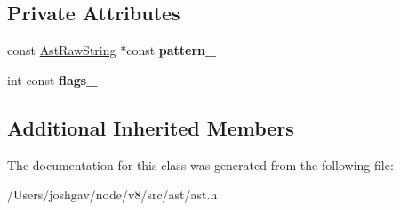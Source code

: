 \subsection*{Private Attributes}
\begin{DoxyCompactItemize}
\item 
const \hyperlink{classv8_1_1internal_1_1_ast_raw_string}{Ast\+Raw\+String} $\ast$const {\bfseries pattern\+\_\+}\hypertarget{classv8_1_1internal_1_1_reg_exp_literal_a22493dc17d3828e1fa7e92c63ded6bc7}{}\label{classv8_1_1internal_1_1_reg_exp_literal_a22493dc17d3828e1fa7e92c63ded6bc7}

\item 
int const {\bfseries flags\+\_\+}\hypertarget{classv8_1_1internal_1_1_reg_exp_literal_a187752fa3c0fe467efde191fa2214701}{}\label{classv8_1_1internal_1_1_reg_exp_literal_a187752fa3c0fe467efde191fa2214701}

\end{DoxyCompactItemize}
\subsection*{Additional Inherited Members}


The documentation for this class was generated from the following file\+:\begin{DoxyCompactItemize}
\item 
/\+Users/joshgav/node/v8/src/ast/ast.\+h\end{DoxyCompactItemize}
